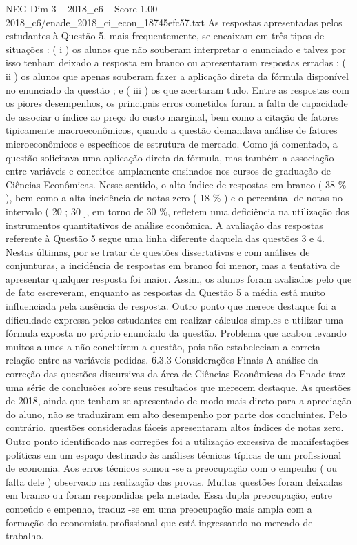 \begin{textsample}{NEG Dim 3 – 2018\_c6 – Score 1.00 – 2018\_c6/enade\_2018\_ci\_econ\_18745efc57.txt}
As respostas apresentadas pelos estudantes à Questão 5, mais frequentemente, se encaixam em três tipos de situações : ( i ) os alunos que não souberam interpretar o enunciado e talvez por isso tenham deixado a resposta em branco ou apresentaram respostas erradas ; ( ii ) os alunos que apenas souberam fazer a aplicação direta da fórmula disponível no enunciado da questão ; e ( iii ) os que acertaram tudo.
Entre as respostas com os piores desempenhos, os principais erros cometidos foram a falta de capacidade de associar o índice ao preço do custo marginal, bem como a citação de fatores tipicamente macroeconômicos, quando a questão demandava análise de fatores microeconômicos e específicos de estrutura de mercado.
Como já comentado, a questão solicitava uma aplicação direta da fórmula, mas também a associação entre variáveis e conceitos amplamente ensinados nos cursos de graduação de Ciências Econômicas.
Nesse sentido, o alto índice de respostas em branco ( 38 \% ), bem como a alta incidência de notas zero ( 18 \% ) e o percentual de notas no intervalo ( 20 ; 30 ], em torno de 30 \%, refletem uma deficiência na utilização dos instrumentos quantitativos de análise econômica.
A avaliação das respostas referente à Questão 5 segue uma linha diferente daquela das questões 3 e 4.
Nestas últimas, por se tratar de questões dissertativas e com análises de conjunturas, a incidência de respostas em branco foi menor, mas a tentativa de apresentar qualquer resposta foi maior.
Assim, os alunos foram avaliados pelo que de fato escreveram, enquanto as respostas da Questão 5 a média está muito influenciada pela ausência de resposta.
Outro ponto que merece destaque foi a dificuldade expressa pelos estudantes em realizar cálculos simples e utilizar uma fórmula exposta no próprio enunciado da questão.
Problema que acabou levando muitos alunos a não concluírem a questão, pois não estabeleciam a correta relação entre as variáveis pedidas. 6.3.3 Considerações Finais A análise da correção das questões discursivas da área de Ciências Econômicas do Enade traz uma série de conclusões sobre seus resultados que merecem destaque.
As questões de 2018, ainda que tenham se apresentado de modo mais direto para a apreciação do aluno, não se traduziram em alto desempenho por parte dos concluintes.
Pelo contrário, questões consideradas fáceis apresentaram altos índices de notas zero.
Outro ponto identificado nas correções foi a utilização excessiva de manifestações políticas em um espaço destinado às análises técnicas típicas de um profissional de economia.
Aos erros técnicos somou -se a preocupação com o empenho ( ou falta dele ) observado na realização das provas.
Muitas questões foram deixadas em branco ou foram respondidas pela metade.
Essa dupla preocupação, entre conteúdo e empenho, traduz -se em uma preocupação mais ampla com a formação do economista profissional que está ingressando no mercado de trabalho.

\end{textsample}

